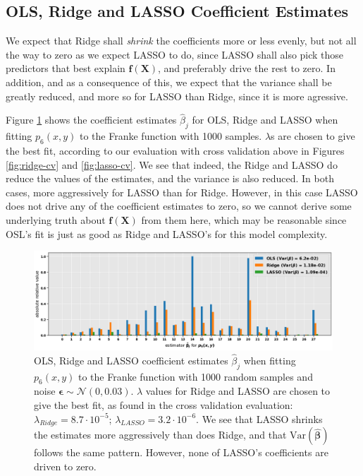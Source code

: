 \documentclass[]{article}
\begin{document}
\subsection{OLS, Ridge and LASSO Coefficient Estimates}
We expect that Ridge shall \textit{shrink} the coefficients more or less evenly, but not all the way to zero as we expect LASSO to do, since LASSO shall also pick those predictors that best explain $\mathbf{f}(\mathbf{X})$, and preferably drive the rest to zero. In addition, and as a consequence of this, we expect that the variance shall be greatly reduced, and more so for LASSO than Ridge, since it is more agressive. 

Figure \ref{fig:ols-ridge-lasso-betas} shows the coefficient estimates $\hat{\beta}_j$ for OLS, Ridge and LASSO when fitting $p_6(x,y)$ to the Franke function with 1000 samples. $\lambda$s are chosen to give the best fit, according to our evaluation with cross validation above in Figures \ref{fig:ridge-cv} and \ref{fig:lasso-cv}. We see that indeed, the Ridge and LASSO do reduce the values of the estimates, and the variance is also reduced. In both cases, more aggressively for LASSO than for Ridge. However, in this case LASSO does not drive any of the coefficient estimates to zero, so we cannot derive some underlying truth about $\mathbf{f}(\mathbf{X})$ from them here, which may be reasonable since OSL's fit is just as good as Ridge and LASSO's for this model complexity.

\begin{figure}[!htb]
	\centering
	\includegraphics[width=1\linewidth]{./results/ols-ridge-lasso-betas.png}
	\caption{OLS, Ridge and LASSO coefficient estimates $\hat{\beta}_j$ when fitting $p_6(x,y)$ to the Franke function with 1000 random samples and noise $\mathbf{\epsilon} \sim \mathcal{N}(0, 0.03)$. $\lambda$ values for Ridge and LASSO are chosen to give the best fit, as found in the cross validation evaluation: $\lambda_{Ridge} = 8.7 \cdot 10^{-5}$; $\lambda_{LASSO} = 3.2 \cdot 10^{-6}$. We see that LASSO shrinks the estimates more aggressively than does Ridge, and that $\mathrm{Var}(\mathbf{\hat{\beta}})$ follows the same pattern. However, none of LASSO's coefficients are driven to zero.}
	\label{fig:ols-ridge-lasso-betas}
\end{figure}
\end{document}
